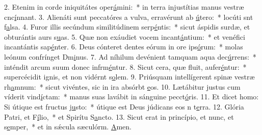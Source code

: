 2. Etenim in corde iniquitátes oper\uline{á}mini:~* in terra injustítias manus vestræ cnc\uline{í}nnant.
3. Alienáti sunt peccatóres a vulva, erravérunt ab \uline{ú}tero:~* locúti snt f\uline{a}lsa.
4. Furor illis secúndum similitúdinem serp\uline{é}ntis:~* sicut áspidis surdæ, et obturántis aurs s\uline{u}as.
5. Quæ non exáudiet vocem incant\uline{á}ntium:~* et venéfici incantántis sap\uline{é}nter.
6. Deus cónteret dentes eórum in ore ips\uline{ó}rum:~* molas leónum confrínget Dm\uline{i}nus.
7. Ad níhilum devénient tamquam aqua dec\uline{ú}rrens:~* inténdit arcum suum donec infrm\uline{é}ntur.
8. Sicut cera, quæ fluit, aufer\uline{é}ntur:~* supercécidit ignis, et non vidérnt s\uline{o}lem.
9. Priúsquam intellígerent spinæ vestræ rh\uline{a}mnum:~* sicut vivéntes, sic in ira absórbt \uline{e}os.
10. Lætábitur justus cum víderit vind\uline{í}ctam:~* manus suas lavábit in sánguine pecct\uline{ó}ris.
11. Et dicet homo: Si útique est fructus j\uline{u}sto:~* útique est Deus júdicans eos n t\uline{e}rra.
12. Glória Patri, et F\uline{í}lio,~* et Spirítu S\uline{a}ncto.
13. Sicut erat in princípio, et nunc, et s\uline{e}mper,~* et in sǽcula sæculórm. \uline{A}men.
